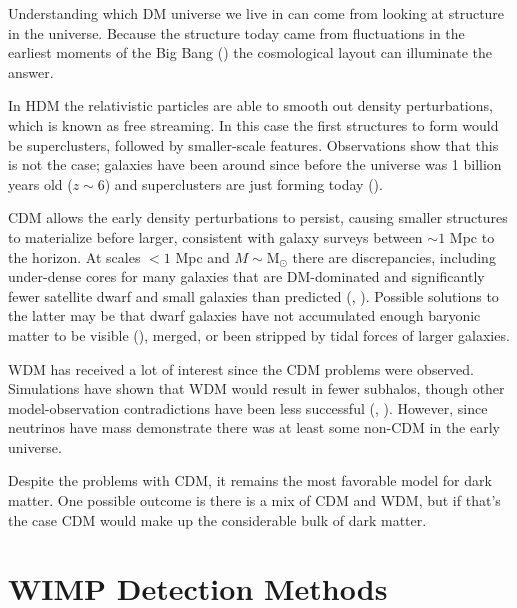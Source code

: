 Understanding which DM universe we live in can come from looking at structure in the universe.  Because the structure
today came from fluctuations in the earliest moments of the Big Bang () the cosmological layout
can illuminate the answer.

In HDM the relativistic particles are able to smooth out density perturbations, which is known as free
streaming.  In this case the first structures to form would be superclusters, followed by smaller-scale
features.  Observations show that this is not the case; galaxies have been around since before the universe
was 1 billion years old ($z \sim 6$) and superclusters are just forming today ().

CDM allows the early density perturbations to persist, causing smaller structures to materialize before
larger, consistent with galaxy surveys between $\sim 1$ Mpc to the horizon.  At scales $< 1$ Mpc and
$M \sim \mathrm{M_{\odot}}$ there are discrepancies, including under-dense cores for many galaxies that are DM-dominated
and significantly fewer satellite dwarf and small galaxies than predicted (, ).  Possible
solutions to the latter may be that dwarf galaxies have not accumulated enough baryonic matter to be visible
(), merged, or been stripped by tidal forces of larger galaxies.

WDM has received a lot of interest since the CDM problems were observed.  Simulations have shown that
WDM would result in fewer subhalos, though other model-observation contradictions have been less
successful (, ).  However, since neutrinos have mass demonstrate there
was at least some non-CDM in the early universe.

Despite the problems with CDM, it remains the most favorable model for dark matter.  One possible outcome is
there is a mix of CDM and WDM, but if that's the case CDM would make up the considerable bulk of dark matter.


\section[WIMP Detection Methods][WIMP Detection Methods]{WIMP Detection Methods}
\label{sec:detection}

